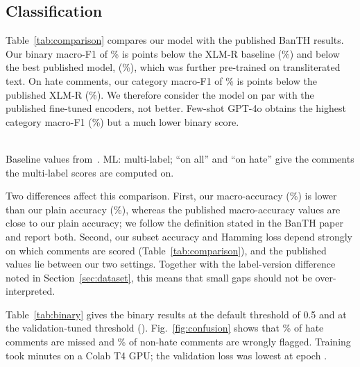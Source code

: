 \documentclass[conference,letterpaper,10pt]{IEEEtran}
\begin{document}
\subsection{Classification}
Table~\ref{tab:comparison} compares our model with the published BanTH results. Our binary macro-F1 of \binF\% is \gapBin{} points below the XLM-R baseline (\blXlmrBin\%) and below the best published model, \blBestBinModel{} (\blBestBin\%), which was further pre-trained on transliterated text. On hate comments, our category macro-F1 of \mlFhate\% is \gapMl{} points below the published XLM-R (\blXlmrMl\%). We therefore consider the model on par with the published fine-tuned encoders, not better. Few-shot GPT-4o obtains the highest category macro-F1 (\blBestMl\%) but a much lower binary score.

\begin{table}[!htb]
\caption{Test Results Compared With Published BanTH Baselines (\%)}
\label{tab:comparison}
\centering
\small
\resizebox{\columnwidth}{!}{}
\\[2pt]
\footnotesize Baseline values from~\cite{haider2025banth}. ML: multi-label; ``on all'' and ``on hate'' give the comments the multi-label scores are computed on.
\end{table}

Two differences affect this comparison. First, our macro-accuracy (\binMacroAcc\%) is lower than our plain accuracy (\binAcc\%), whereas the published macro-accuracy values are close to our plain accuracy; we follow the definition stated in the BanTH paper and report both. Second, our subset accuracy and Hamming loss depend strongly on which comments are scored (Table~\ref{tab:comparison}), and the published values lie between our two settings. Together with the label-version difference noted in Section~\ref{sec:dataset}, this means that small gaps should not be over-interpreted.

Table~\ref{tab:binary} gives the binary results at the default threshold of 0.5 and at the validation-tuned threshold (\binThr). Fig.~\ref{fig:confusion} shows that \pctFN\% of hate comments are missed and \pctFP\% of non-hate comments are wrongly flagged. Training took \trainMinutes{} minutes on a Colab T4 GPU; the validation loss was lowest at epoch \bestEpoch{}.

\begin{table}[!htb]
\caption{Binary Results on the Test Split (\%)}
\label{tab:binary}
\centering
\small
\resizebox{\columnwidth}{!}{}
\end{table}
\end{document}
